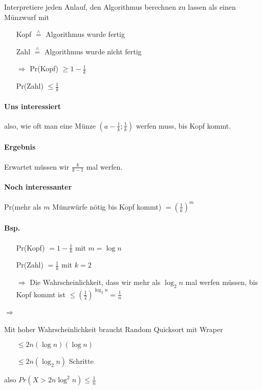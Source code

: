\par\medskip
Interpretiere jeden Anlauf, den Algorithmus berechnen zu lassen als einen Münzwurf mit
\begin{itemize}
	\item[] Kopf $\overset{\wedge}{=}$ Algorithmus wurde fertig
	\item[] Zahl $\overset{\wedge}{=}$ Algorithmus wurde nicht fertig
	\item[$\Rightarrow$] Pr(Kopf) $\geq 1 - \frac{1}{k}$
	\item[] Pr(Zahl) $\leq \frac{1}{k}$
\end{itemize}
\par\medskip

\paragraph*{Uns interessiert} also, wie oft man eine Münze $(a-\frac{1}{k};\frac{1}{k})$ werfen muss, bis Kopf kommt.

\paragraph*{Ergebnis} Erwartet müssen wir $\frac{k}{k-1}$ mal werfen.

\paragraph*{Noch interessanter} Pr(mehr als $m$ Münzwürfe nötig bis Kopf kommt) $= (\frac{1}{k})^m$

\paragraph*{Bsp.}
\begin{itemize}
	\item[] Pr(Kopf) $= 1 - \frac{1}{k}$ mit $m = \log n$ %
	\item[] Pr(Zahl) $= \frac{1}{k}$ mit $k=2$
	\item[$\Rightarrow$] Die Wahrscheinlichkeit, dass wir mehr als $\log_2 n$ mal werfen müssen, bis Kopf kommt ist $\leq (\frac{1}{2})^{\log_2 n} = \frac{1}{n}$
\end{itemize}

\paragraph*{$\Rightarrow$} Mit hoher Wahrscheinlichkeit braucht Random Quicksort mit Wraper
\begin{itemize}
	\item[] $\leq 2n (\log n)(\log n)$
	\item[] $\leq 2n (\log_2 n)$ Schritte
\end{itemize}
also $Pr(X > 2n \log^2 n)  \leq \frac{1}{n}$

